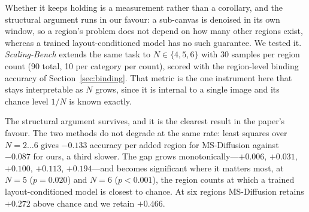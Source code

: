 \documentclass[review,10pt,times]{elsarticle}
\begin{document}
Whether it keeps holding is a measurement rather than a corollary, and the
structural argument runs in our favour: a sub-canvas is denoised in its own
window, so a region's problem does not depend on how many other regions
exist, whereas a trained layout-conditioned model has no such guarantee.  We
tested it.  \emph{Scaling-Bench} extends the same task to $N\in\{4,5,6\}$
with 30 samples per region count (90 total, 10 per category per count),
scored with the region-level binding accuracy of Section~\ref{sec:binding}.
That metric is the one instrument here that stays interpretable as $N$ grows,
since it is internal to a single image and its chance level $1/N$ is known
exactly.

\begin{table}[htbp]
\centering
\caption{%
  \textbf{Region-level binding accuracy against region count.}
  Scaling-Bench, 30 samples per $N$; the $N{=}2,3$ columns are the
  Mixed-Eval-v1 numbers of Table~\ref{tab:binding}, repeated for continuity.
  $\Delta$ and $p$ compare our default ($\tau{=}0.7$) against MS-Diffusion,
  paired and two-sided; the $\tau{=}0.5$ row is kept to separate the release
  point's contribution from the method's.  Both methods stay above chance at
  every $N$, and the gap between them grows monotonically with the number of
  regions, from $+0.006$ at two to $+0.194$ at six.%
}
\label{tab:scaling}
\end{table}

The structural argument survives, and it is the clearest result in the
paper's favour.  The two methods do not degrade at the same rate: least
squares over $N{=}2\ldots6$ gives $-0.133$ accuracy per added region for
MS-Diffusion against $-0.087$ for ours, a third slower.  The gap grows
monotonically---$+0.006$, $+0.031$, $+0.100$, $+0.113$, $+0.194$---and
becomes significant where it matters most, at $N{=}5$ ($p{=}0.020$) and
$N{=}6$ ($p{<}0.001$), the region counts at which a trained
layout-conditioned model is closest to chance.  At six regions MS-Diffusion
retains $+0.272$ above chance and we retain $+0.466$.
\end{document}
